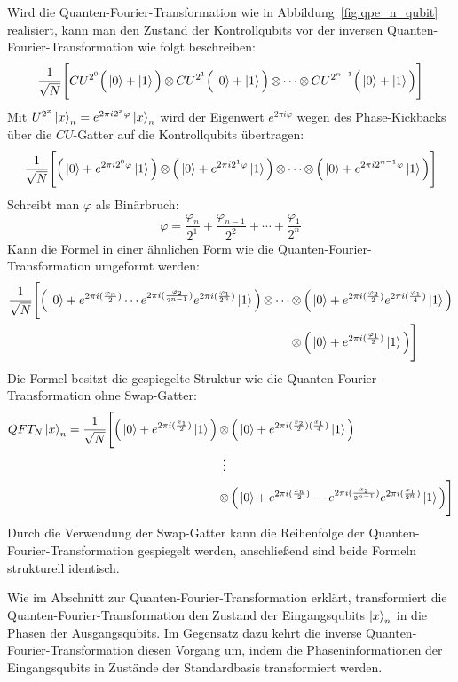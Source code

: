 Wird die Quanten-Fourier-Transformation wie in Abbildung~\ref{fig:qpe_n_qubit} realisiert,
kann man den Zustand der Kontrollqubits vor der inversen Quanten-Fourier-Transformation wie folgt beschreiben:
\[\frac{1}{\sqrt{N}}\Bigg[
  CU^{2^0}\Big(\ket{0} + \ket{1}\Big) \operatorname{\otimes}
  CU^{2^1}\Big(\ket{0} + \ket{1}\Big) \operatorname{\otimes} 
  \dotsb \operatorname{\otimes}
  CU^{2^{n-1}}\Big(\ket{0} + \ket{1}\Big) 
  \Bigg]\]
Mit \(U^{2^x}\ket{x}_n=e^{2\pi i 2^x\varphi}\ket{x}_n\) wird der Eigenwert \(e^{2\pi i \varphi}\) wegen des Phase-Kickbacks
über die \(CU\)-Gatter auf die Kontrollqubits übertragen:
\[\frac{1}{\sqrt{N}}\Bigg[
  \Big(\ket{0} + e^{2\pi i 2^0 \varphi}\ket{1}\Big) \operatorname{\otimes}
  \Big(\ket{0} + e^{2\pi i 2^1 \varphi}\ket{1}\Big) \operatorname{\otimes} 
  \dotsb \operatorname{\otimes}
  \Big(\ket{0} + e^{2\pi i 2^{n-1} \varphi}\ket{1}\Big) 
  \Bigg]\]
Schreibt man \(\varphi\) als Binärbruch:
\[\varphi = \frac{\varphi_n}{2^1} + \frac{\varphi_{n-1}}{2^2} + \dotsb + \frac{\varphi_1}{2^n}\]
Kann die Formel in einer ähnlichen Form wie die Quanten-Fourier-Transformation umgeformt werden:
\begin{align*}
\frac{1}{\sqrt{N}}\Bigg[
  \Big(\ket{0} + e^{2\pi i (\frac{\varphi_n}{2})} 
  \dotsb  
  e^{2\pi i (\frac{\varphi_2}{2^{n-1}})}e^{2\pi i (\frac{\varphi_1}{2^{n}})}\ket{1}\Big) 
  \operatorname{\otimes} \dotsb 
  &\operatorname{\otimes}
  \Big(\ket{0} +  e^{2\pi i (\frac{\varphi_2}{2})}e^{2\pi i (\frac{\varphi_1}{4})}\ket{1}\Big)\\ 
  &\operatorname{\otimes} 
  \Big(\ket{0} + e^{2\pi i (\frac{\varphi_1}{2})}\ket{1}\Big) 
  \Bigg]
\end{align*}
Die Formel besitzt die gespiegelte Struktur wie die Quanten-Fourier-Transformation ohne Swap-Gatter:
\begin{align*}
  QFT_{N}\ket{x}_{n} = 
  \frac{1}{\sqrt{N}}
  \Bigg[
    \Big(\ket{0} + { e^{2 \pi i (\frac{x_1}{2})}}\ket{1}\Big) 
    &\tensor
    \Big( \ket{0} + { e^{2 \pi i (\frac{x_2}{2})(\frac{x_1}{4})}}\ket{1}\Big)\\
    &\vdotswithin{\tensor}\\
    &\tensor
    \Big(\ket{0} + e^{2\pi i (\frac{x_n}{2})} \dotsb e^{2\pi i (\frac{x_2}{2^{n-1}})}e^{2\pi i (\frac{x_1}{2^{n}})}\ket{1}\Big)
  \Bigg]
\end{align*}
Durch die Verwendung der Swap-Gatter kann die Reihenfolge der Quanten-Fourier-Transformation gespiegelt werden, 
anschließend sind beide Formeln strukturell identisch.

Wie im Abschnitt zur Quanten-Fourier-Transformation erklärt,
transformiert die Quanten-Fourier-Transformation den Zustand der Eingangsqubits \(\ket{x}_n\) in die Phasen der Ausgangsqubits.
Im Gegensatz dazu kehrt die inverse Quanten-Fourier-Transformation diesen Vorgang um, 
indem die Phaseninformationen der Eingangsqubits in Zustände der Standardbasis transformiert werden.

